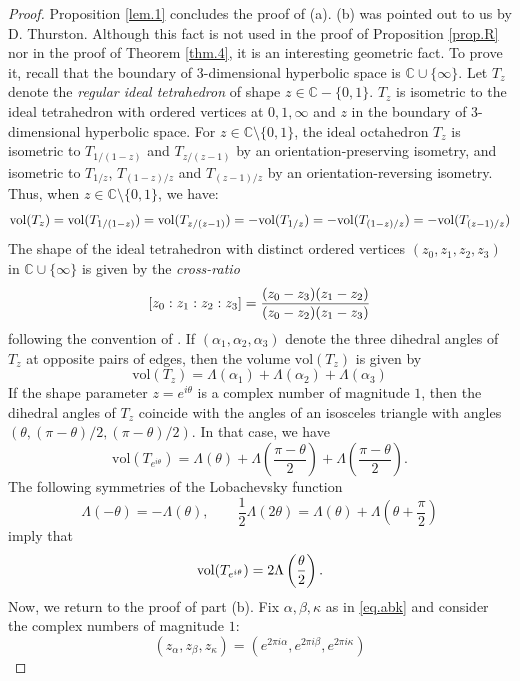 \documentclass{amsart}
\theoremstyle{definition}
\def\printname#1{
    \if\draft y
        \smash{\makebox[0pt]{\hspace{-0.5in}
            \raisebox{8pt}{\tt\tiny #1}}}
    \fi
}
\def\lbl#1{\label{#1}\printname{#1}}
\def\BC{\mathbb C}
\def\a{\alpha}
\def\La{\Lambda}
\def\b{\beta}
\def\th{\theta}
\def\vol{\mathrm{vol}}
\begin{document}
\begin{proof}
Proposition \ref{lem.1} concludes the proof of (a).
(b) was pointed out to us by D. Thurston. Although this fact is not used
in the proof of Proposition \ref{prop.R} nor in the proof of Theorem
\ref{thm.4}, it is an interesting geometric fact. To prove it, recall that
the boundary of 3-dimensional hyperbolic space is $\BC \cup\{\infty\}$.
Let $T_z$ denote the {\em regular ideal tetrahedron} of shape
$z \in \BC-\{0,1\}$. $T_z$ is isometric to the ideal tetrahedron with
ordered vertices
at $0,1,\infty$ and $z$ in the boundary of 3-dimensional hyperbolic space.
For $z \in \BC\setminus\{0,1\}$, the ideal octahedron $T_z$ is isometric
to $T_{1/(1-z)}$ and $T_{z/(z-1)}$ by an orientation-preserving isometry,
and isometric to $T_{1/z}$, $T_{(1-z)/z}$ and $T_{(z-1)/z}$ by an orientation-reversing
isometry. Thus, when $z  \in \BC\setminus\{0,1\}$, we have:
\begin{equation}
\lbl{eq.Tzorbit}
\vol(T_z)=\vol(T_{1/(1-z)})=\vol(T_{z/(z-1)})=-\vol(T_{1/z})=-\vol(T_{(1-z)/z})=
-\vol(T_{(z-1)/z})
\end{equation}
The shape of the ideal tetrahedron
with distinct ordered vertices $(z_0,z_1,z_2,z_3)$ in $\BC\cup\{\infty\}$
is given by the {\em cross-ratio}
\begin{equation}
\lbl{eq.CR}
[z_0:z_1:z_2:z_3]=\frac{(z_0-z_3)(z_1-z_2)}{(z_0-z_2)(z_1-z_3)}
\end{equation}
following the convention of \cite[Eqn.1.4]{DZ}.
If $(\a_1,\a_2,\a_3)$ denote the three dihedral angles of $T_z$ at opposite pairs
of edges, then the volume $\vol(T_z)$ is given by \cite[Thm.10.4.10]{Ra}
$$
\vol(T_z)=\La(\a_1)+\La(\a_2)+\La(\a_3)
$$
If the shape parameter $z=e^{i \th}$ is a complex number of magnitude $1$,
then the dihedral angles of $T_z$ coincide with the angles
of an isosceles triangle with angles $(\th,(\pi-\th)/2,(\pi-\th)/2)$.
In that case, we have
$$
\vol(T_{e^{i \th}})=\La\left(\th\right)+
\La\left(\frac{\pi-\th}{2}\right)+\La\left(\frac{\pi-\th}{2}\right).
$$
The following symmetries of the Lobachevsky function
\cite[Thm.10.4.3,10.4.4]{Ra}
$$
\La(-\th)=-\La(\th), \qquad \frac{1}{2} \La(2\th)=\La(\th)
+\La\left(\th+\frac{\pi}{2}\right)
$$
imply that
\begin{equation}
\lbl{eq.Tzth}
\vol(T_{e^{i \th}})=2 \La\left(\frac{\th}{2}\right).
\end{equation}
Now, we return to the proof of part (b). Fix $\a,\b,\kappa$ as in
\eqref{eq.abk} and consider the complex numbers of magnitude $1$:
$$
(z_{\a},z_{\b},z_{\kappa})=(e^{2 \pi i \a},e^{2 \pi i \b}, e^{2 \pi i \kappa})
$$

\end{proof}
\end{document}
